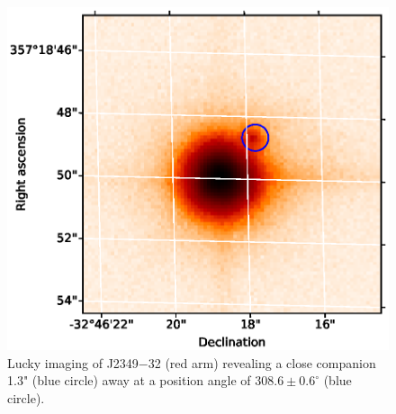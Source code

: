 \begin{figure}[htb]
  \centering
  \includegraphics[]{8-Results/J2349-32/lucky.eps}
  \caption{Lucky imaging of J2349$-$32 (red arm) revealing a close companion 1.3" (blue circle) away at a position angle of $308.6 \pm 0.6^\circ$ (blue circle).}
  \label{fig:J2349-32:lucky}
\end{figure}


